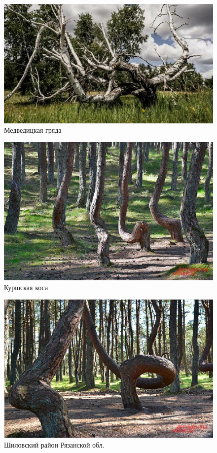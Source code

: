 \documentclass[11pt]{article}
\begin{document}
\begin{figure}[!htpb]
\centering
\includegraphics[scale=0.5]{medved_2}
\caption{Медведицкая гряда}
\label{}
\end{figure}



\begin{figure}[!htpb]
\centering
\includegraphics[scale=0.9]{Kurshskaya}
\caption{Куршская коса}
\label{}
\end{figure}

\begin{figure}[!htpb]
\centering
\includegraphics[scale=0.9]{Shilov}
\caption{Шиловский район Рязанской обл.}
\label{}
\end{figure}
\end{document}
